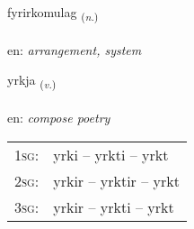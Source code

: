 \documentclass[frontgrid, backgrid]{flacards}\usepackage[]{graphicx}\usepackage[]{color}
\begin{document}
\renewcommand{\flhead}{\vskip5pt \fboxsep=0pt {\small\bfseries\footnotesize Nafnorð | Noun}}
\renewcommand{\fcfoot}{\vskip5pt \fboxsep=0pt \hspace{2pt}{\small\bfseries\footnotesize 2K}}

\renewcommand{\blhead}{\vskip5pt {\small\bfseries\footnotesize Nafnorð | Noun }}
\renewcommand{\bcfoot}{\vskip5pt \hspace{2pt}{\small\bfseries\footnotesize 2K}}


{fyrirkomulag \small{\textsubscript{(\textit{n.})}} \\[1ex] %
 \\
en: \emph{arrangement, system} \\  [2ex]
\renewcommand*{\arraystretch}{0.8}
}

\renewcommand{\flhead}{\vskip5pt \fboxsep=0pt {\small\bfseries\footnotesize Sagnorð | Verb}}
\renewcommand{\fcfoot}{\vskip5pt \fboxsep=0pt \hspace{2pt}{\small\bfseries\footnotesize 2K}}

\renewcommand{\blhead}{\vskip5pt {\small\bfseries\footnotesize Sagnorð | Verb }}
\renewcommand{\bcfoot}{\vskip5pt \hspace{2pt}{\small\bfseries\footnotesize 2K}}


{yrkja \small{\textsubscript{(\textit{v.})}} \\[1ex] %
\textphonetic{[ɪr̥ca]} \\
en: \emph{compose poetry} \\  [2ex]
\renewcommand*{\arraystretch}{0.8}
\begin{tabular}{p{1cm}l}
\textsc{1sg}: & yrki -- yrkti -- yrkt \\ 
\textsc{2sg}: & yrkir -- yrktir -- yrkt \\ 
\textsc{3sg}: & yrkir -- yrkti -- yrkt \\ 
\end{tabular}
}
\end{document}
